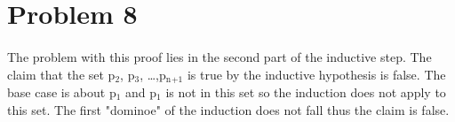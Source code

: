 \documentclass[11pt]{article}
\begin{document}
\section{Problem 8}
\label{sec:orga481b97}
\paragraph{}
The problem with this proof lies in the second part of the inductive step.  The claim that the set p\(_{\text{2}}\), p\(_{\text{3}}\), \ldots{},p\(_{\text{n}}\)\(_{\text{+1}}\) is true by the inductive hypothesis is false. The base case is about p\(_{\text{1}}\) and p\(_{\text{1}}\) is not in this set so the induction does not apply to this set. The first "dominoe" of the induction does not fall thus the claim is false. 
\end{document}
